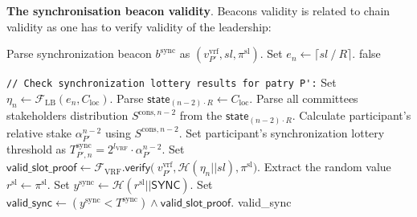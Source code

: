 \bigbreak
\bigbreak
\noindent
{}
\textbf{The synchronisation beacon validity}.\label{apndx:sync-beacon-validity-protocol}
Beacons validity is related to chain validity as one has to verify validity of the leadership:
\begin{protocol}
    \caption{$\textsf{ValidBeacon}(P, \text{sid}, R, l_{\text{VRF}}, K_{\text{f}}, b^{\text{sync}}, \mathcal{C}_{\text{loc}})$}
    \begin{algorithmic}[1]
        \State Parse synchronization beacon $b^{\text{sync}}$ as $(v_{P'}^{\text{vrf}}, sl, \pi^{\text{sl}})$.
        \State Set $e_n \leftarrow \lceil sl \mathbin{/} R \rceil$.
            \State \Return \textsf{false}
        \EndIf

        \noindent
        \lstinline|// Check synchronization lottery results for patry P':|
        \State Set ${\eta_{n} \leftarrow \mathcal{F}_{\text{LB}}(e_{n}, C_{\text{loc}})}$.
        \State Parse $\textsf{state}_{(n - 2)\cdot R} \leftarrow C_{\text{loc}}$.
        \State Parse all committees stakeholders distribution $S^{\text{cons}, n - 2}$ from the $\textsf{state}_{(n - 2)\cdot R}$.
        \State Calculate participant's relative stake $\alpha^{n-2}_{P'}$ using $S^{\text{cons}, {n - 2}}$.
        \State Set participant's synchronization lottery threshold as $T_{P', n}^{\text{sync}} = 2^{l_{\text{VRF}}} \cdot \alpha^{n-2}_{P'}$.
        \State Set $\textsf{valid\_slot\_proof} \leftarrow \mathcal{F}_{\text{VRF}}\textsf{.verify(}\
        v_{P'}^{\text{vrf}}, \mathcal{H}(\eta_n || sl),\pi^{\text{sl}} \textsf{)}$.
        \State Extract the random value ${r^{\text{sl}} \leftarrow \pi^{\text{sl}}}$.
        \State Set ${y^{\text{sync}} \leftarrow {\mathcal{H}(r^{\text{sl}} || \textsf{SYNC})}}$.
        \State Set ${\textsf{valid\_sync} \leftarrow (y^{\text{sync}} < T^{\text{sync}}) \wedge \textsf{valid\_slot\_proof}}$.
        \State \Return \textsf{valid\_sync}

    \end{algorithmic}\label{alg:sync-beacon-validity-protocol}
\end{protocol}